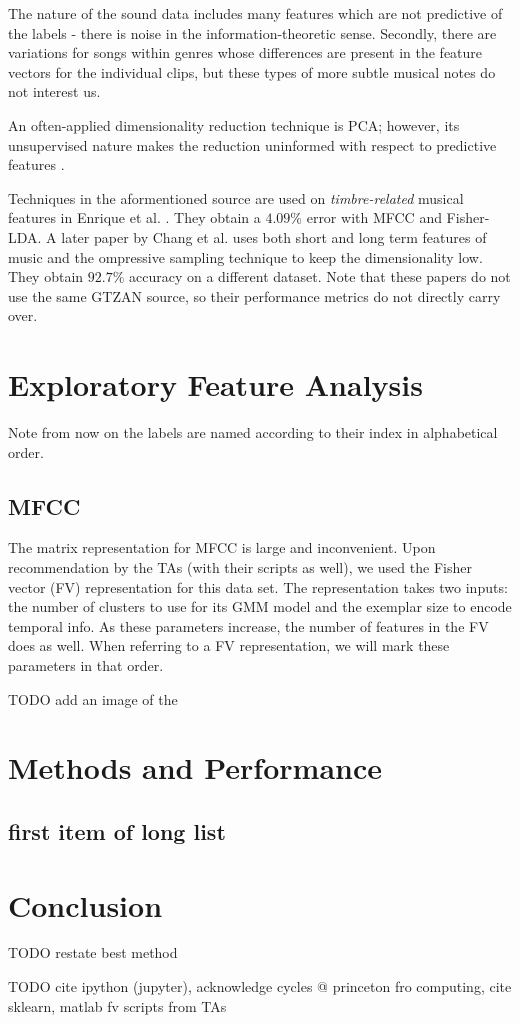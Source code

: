 \documentclass{article}
\begin{document}
The nature of the sound data includes many features which are not predictive of the labels - there is noise in the information-theoretic sense. Secondly, there are variations for songs within genres whose differences are present in the feature vectors for the individual clips, but these types of more subtle musical notes do not interest us.

An often-applied dimensionality reduction technique is PCA; however, its unsupervised nature makes the reduction uninformed with respect to predictive features \cite{WellingNote}.

Techniques in the aformentioned source are used on {\em timbre-related} musical features in Enrique et al. \cite{ERLGRR}. They obtain a $4.09\%$  error with MFCC and Fisher-LDA. A later paper by Chang et al. \cite{CJI10} uses both short and long term features of music and the ompressive sampling technique to keep
the dimensionality low. They obtain $92.7\%$ accuracy on a different dataset. Note that these papers do not use the same GTZAN source, so their performance metrics do not directly carry over.

\section{Exploratory Feature Analysis}

Note from now on the labels are named according to their index in alphabetical order.

\subsection{MFCC}

The matrix representation for MFCC is large and inconvenient. Upon recommendation by the TAs (with their scripts as well), we used the Fisher vector (FV) representation for this data set. The representation takes two inputs: the number of clusters to use for its GMM model and the exemplar size to encode temporal info. As these parameters increase, the number of features in the FV does as well. When referring to a FV representation, we will mark these parameters in that order.

TODO add an image of the 


\section{Methods and Performance}

\subsection{first item of long list}

\section{Conclusion}

TODO restate best method

TODO cite ipython (jupyter), acknowledge cycles @ princeton fro computing, cite sklearn, matlab fv scripts from TAs



\end{document}
